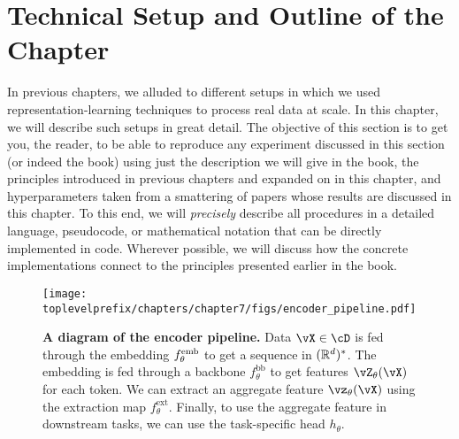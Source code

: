 \documentclass[\toplevelprefix/book-main.tex]{subfiles}
\begin{document}



\section{Technical Setup and Outline of the Chapter}\label{sec:experiment_setup}

In previous chapters, we alluded to different setups in which we used representation-learning techniques to process real data at scale. In this chapter, we will describe such setups in great detail. The objective of this section is to get you, the reader, to be able to reproduce any experiment discussed in this section (or indeed the book) using just the description we will give in the book, the principles introduced in previous chapters and expanded on in this chapter, and hyperparameters taken from a smattering of papers whose results are discussed in this chapter. To this end, we will \textit{precisely} describe all procedures in a detailed language, pseudocode, or mathematical notation that can be directly implemented in code. Wherever possible, we will discuss how the concrete implementations connect to the principles presented earlier in the book.

\begin{figure}
    \texttt{[image: \\toplevelprefix/chapters/chapter7/figs/encoder\_pipeline.pdf]}
    \caption{\small\textbf{A diagram of the encoder pipeline.} Data \(\vX \in \cD\) is fed through the embedding \(f_{\theta}^{\mathrm{emb}}\) to get a sequence in \((\mathbb{R}^{d})^{*}\). The embedding is fed through a backbone \(f_{\theta}^{\mathrm{bb}}\) to get features \(\vZ_{\theta}(\vX)\) for each token. We can extract an aggregate feature \(\vz_{\theta}(\vX)\) using the extraction map \(f_{\theta}^{\mathrm{ext}}\). Finally, to use the aggregate feature in downstream tasks, we can use the task-specific head \(h_{\theta}\).}
    \label{fig:overall_encoder_pipeline}
\end{figure}
\end{document}
